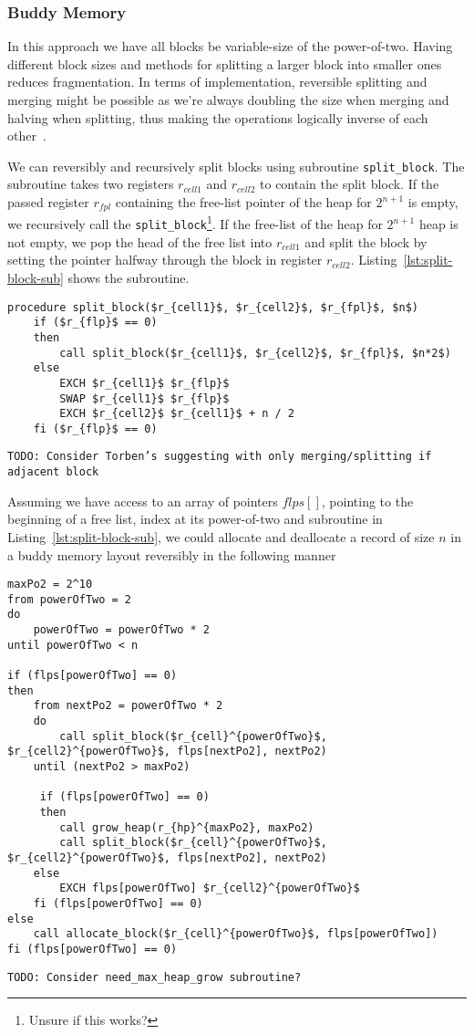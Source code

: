 \subsubsection{Buddy Memory}
In this approach we have all blocks be variable-size of the power-of-two. Having different block sizes and methods for splitting a larger block into smaller ones reduces fragmentation. In terms of implementation, reversible splitting and merging might be possible as we're always doubling the size when merging and halving when splitting, thus making the operations logically inverse of each other~\cite{dk:buddyalloc}.

We can reversibly and recursively split blocks using subroutine \texttt{split\_block}. The subroutine takes two registers $r_{cell1}$ and $r_{cell2}$ to contain the split block. If the passed register $r_{fpl}$ containing the free-list pointer of the heap for $2^{n+1}$ is empty, we recursively call the \texttt{split\_block}\footnote{Unsure if this works?}. If the free-list of the heap for $2^{n+1}$ heap is not empty, we pop the head of the free list into $r_{cell1}$ and split the block by setting the pointer halfway through the block in register $r_{cell2}$. Listing~\ref{lst:split-block-sub} shows the subroutine.   

\begin{lstlisting}[caption={\texttt{split\_block} subroutine}, language=janus, style=basic,label={lst:split-block-sub}]
procedure split_block($r_{cell1}$, $r_{cell2}$, $r_{fpl}$, $n$)
	if ($r_{flp}$ == 0) 
	then
		call split_block($r_{cell1}$, $r_{cell2}$, $r_{fpl}$, $n*2$)
	else
		EXCH $r_{cell1}$ $r_{flp}$
		SWAP $r_{cell1}$ $r_{flp}$
		EXCH $r_{cell2}$ $r_{cell1}$ + n / 2
	fi ($r_{flp}$ == 0)
\end{lstlisting}
\texttt{TODO: Consider Torben's suggesting with only merging/splitting if adjacent block}

Assuming we have access to an array of pointers $flps[]$, pointing to the beginning of a free list, index at its power-of-two and subroutine in Listing~\ref{lst:split-block-sub}, we could allocate and deallocate a record of size $n$ in a buddy memory layout reversibly in the following manner

\begin{lstlisting}[mathescape=true, caption={Allocating and deallocating records of size $n$ using Buddy Memory}, language=janus, style=basic]
maxPo2 = 2^10
from powerOfTwo = 2
do
	powerOfTwo = powerOfTwo * 2
until powerOfTwo < n
	
if (flps[powerOfTwo] == 0) 
then
	from nextPo2 = powerOfTwo * 2
	do
		call split_block($r_{cell}^{powerOfTwo}$, $r_{cell2}^{powerOfTwo}$, flps[nextPo2], nextPo2)
	until (nextPo2 > maxPo2)
	
	 if (flps[powerOfTwo] == 0)
	 then
	 	call grow_heap(r_{hp}^{maxPo2}, maxPo2)
		call split_block($r_{cell}^{powerOfTwo}$, $r_{cell2}^{powerOfTwo}$, flps[nextPo2], nextPo2)
	else
		EXCH flps[powerOfTwo] $r_{cell2}^{powerOfTwo}$
	fi (flps[powerOfTwo] == 0)
else
	call allocate_block($r_{cell}^{powerOfTwo}$, flps[powerOfTwo])
fi (flps[powerOfTwo] == 0) 
\end{lstlisting}
\texttt{TODO: Consider need\_max\_heap\_grow subroutine?}

